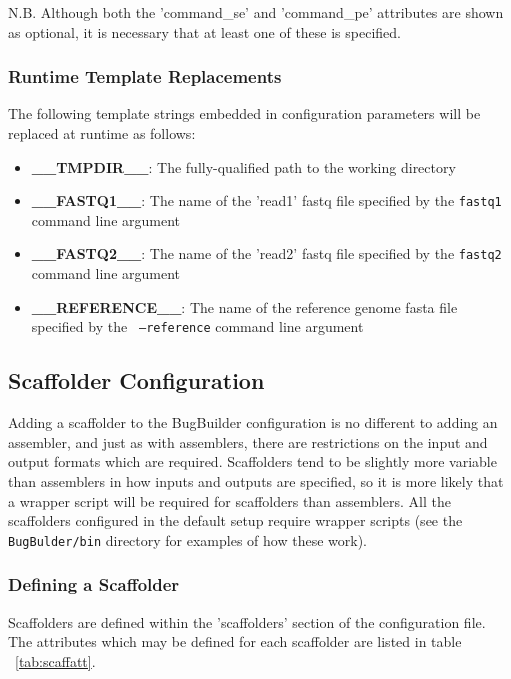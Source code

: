\documentclass[a4paper,10pt]{article}
\begin{document}
N.B. Although both the 'command\_se' and 'command\_pe' attributes are shown as optional, it is necessary that at least one of these is specified.

\subsubsection{Runtime Template Replacements}

The following template strings embedded in configuration parameters will be replaced at runtime as
follows:

\label{sec:asstemplate}
\begin{itemize}
  \setlength\itemsep{0em}
  \item \textbf{\_\_TMPDIR\_\_}: The fully-qualified path to the working directory
  \item \textbf{\_\_FASTQ1\_\_}: The name of the 'read1' fastq file specified by the {\tt fastq1}
command line argument
  \item \textbf{\_\_FASTQ2\_\_}: The name of the 'read2' fastq file specified by the {\tt fastq2}
command line argument
  \item \textbf{\_\_REFERENCE\_\_}: The name of the reference genome fasta file specified by the {\tt
--reference} command line argument
\end{itemize}

\subsection{Scaffolder Configuration}

Adding a scaffolder to the BugBuilder configuration is no different to adding
an assembler, and just as with assemblers, there are restrictions on the input
and output formats which are required.  Scaffolders tend to be slightly more
variable than assemblers in how inputs and outputs are specified, so it is more
likely that a wrapper script will be required for scaffolders than assemblers.
All the scaffolders configured in the default setup require wrapper scripts
(see the {\tt BugBulder/bin} directory for examples of how these work).

\subsubsection{Defining a Scaffolder}

Scaffolders are defined within the 'scaffolders' section of the configuration
file. The attributes which may be defined for each scaffolder are listed in table ~\ref{tab:scaffatt}.
\end{document}
